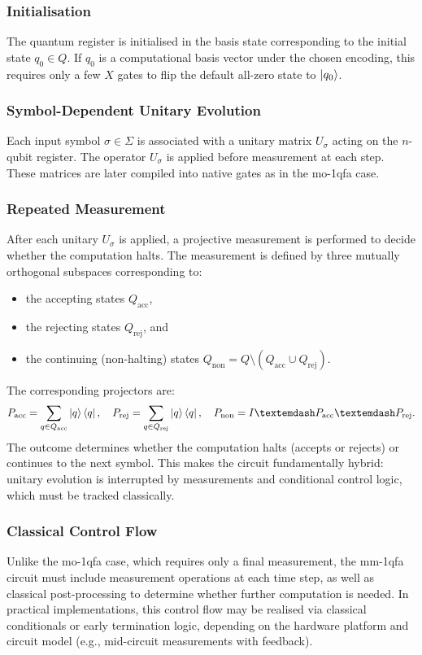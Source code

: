 \subsubsection*{Initialisation}
The quantum register is initialised in the basis state corresponding to the initial state $q_0 \in Q$. If $q_0$ is a computational basis vector under the chosen encoding, this requires only a few $X$ gates to flip the default all-zero state to $\ket{q_0}$.

\subsubsection*{Symbol-Dependent Unitary Evolution}
Each input symbol $\sigma \in \Sigma$ is associated with a unitary matrix $U_\sigma$ acting on the $n$-qubit register. The operator $U_\sigma$ is applied before measurement at each step. These matrices are later compiled into native gates as in the \gls{mo-1qfa} case.

\subsubsection*{Repeated Measurement}
After each unitary $U_\sigma$ is applied, a projective measurement is performed to decide whether the computation halts. The measurement is defined by three mutually orthogonal subspaces corresponding to:
\begin{itemize}
  \item the accepting states $Q_{\text{acc}}$,
  \item the rejecting states $Q_{\text{rej}}$, and
  \item the continuing (non-halting) states $Q_{\text{non}} = Q \setminus (Q_{\text{acc}} \cup Q_{\text{rej}})$.
\end{itemize}
The corresponding projectors are:
\[
P_{\text{acc}} = \sum_{q \in Q_{\text{acc}}} \ket{q}\bra{q}, \quad
P_{\text{rej}} = \sum_{q \in Q_{\text{rej}}} \ket{q}\bra{q}, \quad
P_{\text{non}} = I—P_{\text{acc}}—P_{\text{rej}}.
\]
The outcome determines whether the computation halts (accepts or rejects) or continues to the next symbol. This makes the circuit fundamentally hybrid: unitary evolution is interrupted by measurements and conditional control logic, which must be tracked classically.

\subsubsection*{Classical Control Flow}
Unlike the \gls{mo-1qfa} case, which requires only a final measurement, the \gls{mm-1qfa} circuit must include measurement operations at each time step, as well as classical post-processing to determine whether further computation is needed. In practical implementations, this control flow may be realised via classical conditionals or early termination logic, depending on the hardware platform and circuit model (e.g., mid-circuit measurements with feedback).

